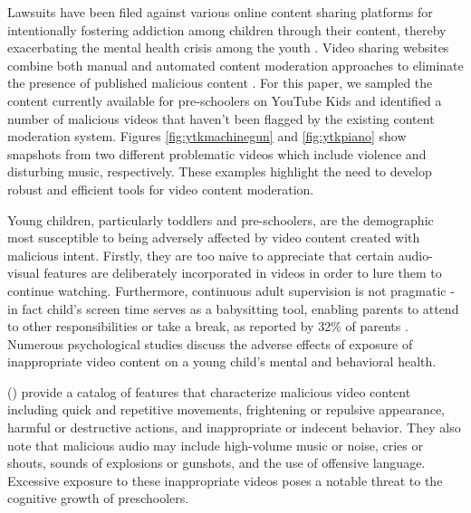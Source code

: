 \documentclass[letterpaper]{article}
\begin{document}
Lawsuits have been filed against various online content sharing platforms for intentionally fostering addiction among children through their content, thereby exacerbating the mental health crisis among the youth \cite{lawsuit}. Video sharing websites combine both manual and automated content moderation approaches to eliminate the presence of published malicious content \cite{YouTubeContentMod,TikTokContentMod}. For this paper, we sampled the content currently available for pre-schoolers on YouTube Kids and identified a number of malicious videos that haven't been flagged by the existing content moderation system. Figures \ref{fig:ytkmachinegun} and \ref{fig:ytkpiano} show snapshots from two different problematic videos which include violence and disturbing music, respectively.   These examples highlight the need to develop robust and efficient tools for video content moderation.

Young children, particularly toddlers and pre-schoolers, are the demographic most susceptible to being adversely affected by video content created with malicious intent. Firstly, they are too naive to appreciate that certain audio-visual features are deliberately incorporated in videos in order to lure them to continue watching. Furthermore, continuous adult supervision is not pragmatic - in fact child's screen time serves as a babysitting tool, enabling parents to attend to other responsibilities or take a break, as reported by 32\% of parents \cite{babysitting_tool}. Numerous psychological studies discuss the adverse effects of exposure of inappropriate video content on a young child's mental and behavioral health.

\citeauthor{ahmed2023flairs} (\citeyear{ahmed2023flairs}) provide a catalog of features that characterize malicious video content including quick and repetitive movements, frightening or repulsive appearance, harmful or destructive actions, and inappropriate or indecent behavior. They also note that malicious audio may include high-volume music or noise, cries or shouts, sounds of explosions or gunshots, and the use of offensive language. Excessive exposure to these inappropriate videos poses a notable threat to the cognitive growth of preschoolers. 
\end{document}
